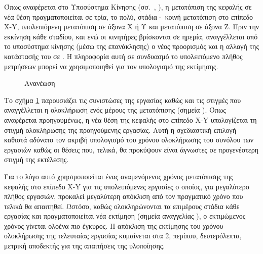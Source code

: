 Όπως αναφέρεται στο Υποσύστημα Κίνησης
(σσ.~\pageref{ssubsec:motor:routing},%
\pageref{ssubsec:motor:common-translation}),
η μετατόπιση της κεφαλής σε νέα θέση πραγματοποιείται σε τρία, το πολύ, στάδια·
κοινή μετατόπιση στο επίπεδο X-Y, υπολειπόμενη μετατόπιση σε άξονα X ή Υ και
μετατόπιση σε άξονα Z. Πριν την εκκίνηση κάθε σταδίου, και ενώ οι κινητήρες
βρίσκονται σε ηρεμία, αναγγέλλεται από το υποσύστημα κίνησης (μέσω της
επανάκλησης) ο νέος προορισμός και η αλλαγή της κατάστασής του σε . Η
πληροφορία αυτή σε συνδυασμό το υπολειπόμενο πλήθος μετρήσεων μπορεί να
χρησιμοποιηθεί για τον υπολογισμό της εκτίμησης.

\begin{figure}
    \caption{Ανανέωση 
    \label{fig:task:estimate-update}}
    \begin{center}
    \end{center}
\end{figure}

Το σχήμα \ref{fig:task:estimate-update} παρουσιάζει τις συνιστώσες της εργασίας
καθώς και τις στιγμές που αναγγέλλεται η ολοκλήρωση ενός μέρους της μετατόπισης
(σημεία ).
Όπως αναφέρεται προηγουμένως, η νέα θέση της κεφαλής στο επίπεδο X-Y
υπολογίζεται τη στιγμή ολοκλήρωσης της προηγούμενης εργασίας. Αυτή η σχεδιαστική
επιλογή καθιστά αδύνατο τον ακριβή υπολογισμό του χρόνου ολοκλήρωσης του συνόλου
των εργασιών καθώς οι θέσεις που, τελικά, θα προκύψουν είναι άγνωστες σε
προγενέστερη στιγμή της εκτέλεσης.

Για το λόγο αυτό χρησιμοποιείται ένας αναμενόμενος χρόνος μετατόπισης της
κεφαλής στο επίπεδο X-Y για τις υπολειπόμενες εργασίες ο οποίος, για μεγαλύτερο
πλήθος εργασιών, προκαλεί μεγαλύτερη απόκλιση από τον πραγματικό χρόνο που
τελικά θα απαιτηθεί. Ωστόσο, καθώς ολοκληρώνονται τα επιμέρους στάδια κάθε
εργασίας και πραγματοποιείται νέα εκτίμηση (σημεία αναγγελίας ), ο
εκτιμώμενος χρόνος γίνεται ολοένα πιο έγκυρος. Η απόκλιση της εκτίμησης του
χρόνου ολοκλήρωσης της τελευταίας εργασίας κυμαίνεται στα 2, περίπου,
δευτερόλεπτα, μετρική αποδεκτής για της απαιτήσεις της υλοποίησης.
